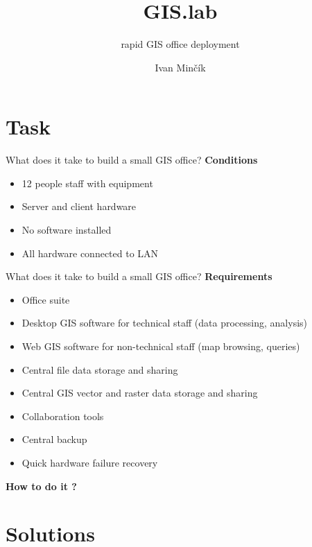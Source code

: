 \documentclass[12pt]{beamer}
\author{Ivan Minčík}
\title{GIS.lab}
\subtitle{rapid GIS office deployment}
\begin{document}
\begin{frame}
	\titlepage
\end{frame}


\section{Task}
\begin{frame}{What does it take to build a small GIS office?}
	\textbf{Conditions}
	\begin{itemize}
		\item 12 people staff with equipment
		\item Server and client hardware
		\item No software installed
		\item All hardware connected to LAN
	\end{itemize}
\end{frame}


\begin{frame}{What does it take to build a small GIS office?}
	\textbf{Requirements}
	\begin{itemize}[<+->]
		\item Office suite
		\item Desktop GIS software for technical staff (data processing, analysis)
		\item Web GIS software for non-technical staff (map browsing, queries)
		\item Central file data storage and sharing
		\item Central GIS vector and raster data storage and sharing
		\item Collaboration tools
		\item Central backup
		\item Quick hardware failure recovery
	\end{itemize}
\end{frame}


\begin{frame}
	\LARGE \textbf{How to do it ?}
\end{frame}


\section{Solutions}
\end{document}
